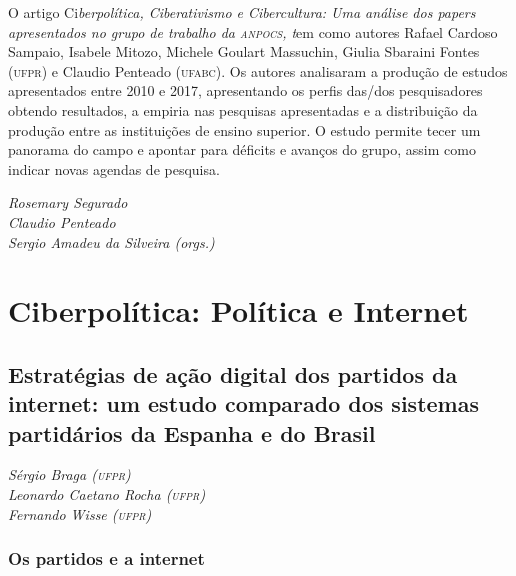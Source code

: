 O artigo Ci\emph{berpolítica, Ciberativismo e Cibercultura: Uma análise
dos papers apresentados no grupo de trabalho da \textsc{anpocs}, t}em como
autores Rafael Cardoso Sampaio, Isabele Mitozo, Michele Goulart
Massuchin, Giulia Sbaraini Fontes (\textsc{ufpr}) e Claudio Penteado (\textsc{ufabc}). Os
autores analisaram a produção de estudos apresentados entre 2010 e 2017,
apresentando os perfis das/dos pesquisadores obtendo resultados, a
empiria nas pesquisas apresentadas e a distribuição da produção entre as
instituições de ensino superior. O estudo permite tecer um panorama do
campo e apontar para déficits e avanços do grupo, assim como indicar
novas agendas de pesquisa.

\begin{flushright}
\vfill
\emph{Rosemary Segurado\\Claudio Penteado\\Sergio Amadeu da Silveira (orgs.)}
\end{flushright}


\part{Ciberpolítica: Política e Internet}

\chapter*{Estratégias de ação digital dos partidos da internet: um estudo
comparado dos sistemas partidários da Espanha e do Brasil}


\begin{flushright}
\emph{Sérgio Braga (\textsc{ufpr})\\Leonardo Caetano Rocha (\textsc{ufpr})\\Fernando Wisse (\textsc{ufpr})}
\end{flushright}

\section{Os partidos e a internet}

